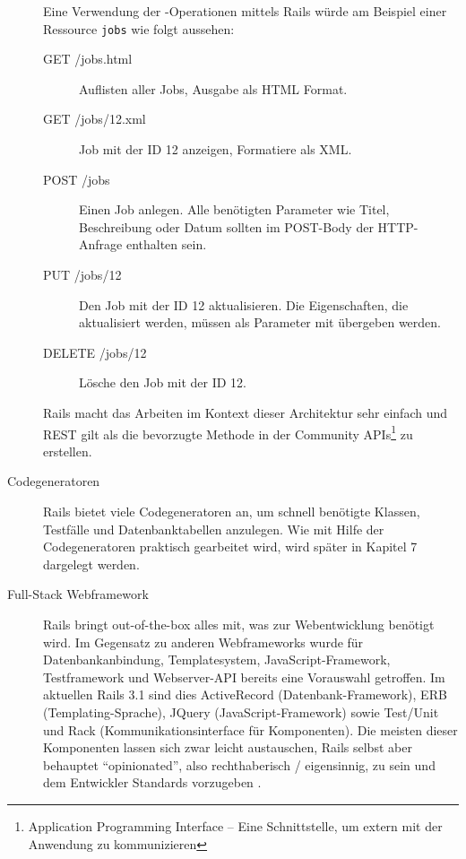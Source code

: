 \begin{description}
 Eine Verwendung der -Operationen mittels Rails würde am Beispiel einer Ressource \texttt{jobs} wie folgt aussehen:
  \begin{description}
  \item[GET /jobs.html] Auflisten aller Jobs, Ausgabe als HTML Format.
  \item[GET /jobs/12.xml] Job mit der ID 12 anzeigen, Formatiere als XML.
  \item[POST /jobs] Einen Job anlegen. Alle benötigten Parameter wie Titel, Beschreibung oder Datum sollten im POST-Body der HTTP-Anfrage enthalten sein.
  \item[PUT /jobs/12] Den Job mit der ID 12 aktualisieren. Die Eigenschaften, die aktualisiert werden, müssen als Parameter mit übergeben werden.
  \item[DELETE /jobs/12] Lösche den Job mit der ID 12.
  \end{description}
 Rails macht das Arbeiten im Kontext dieser Architektur sehr einfach und REST gilt als die bevorzugte Methode in der Community APIs\footnote{Application Programming Interface --  Eine Schnittstelle, um extern mit der Anwendung zu kommunizieren} zu erstellen.
 \item[Codegeneratoren] Rails bietet viele Codegeneratoren an, um schnell benötigte Klassen, Testfälle und Datenbanktabellen anzulegen.  Wie mit Hilfe der Codegeneratoren praktisch gearbeitet wird, wird später in Kapitel 7 dargelegt werden.
 \item[Full-Stack Webframework] Rails 
bringt out-of-the-box alles mit, was zur Webentwicklung benötigt wird. Im Gegensatz zu anderen Webframeworks wurde für Datenbankanbindung, Templatesystem, JavaScript-Framework, Testframework und Webserver-API bereits eine Vorauswahl getroffen. Im aktuellen Rails 3.1 sind dies ActiveRecord (Datenbank-Framework), ERB (Templating-Sprache), JQuery (JavaScript-Framework) sowie Test/Unit und Rack (Kommunikationsinterface für Komponenten). Die meisten dieser Komponenten lassen sich zwar leicht austauschen, Rails selbst aber behauptet "`opinionated"', also rechthaberisch / eigensinnig, zu sein und dem Entwickler Standards vorzugeben \citep{david_heinemeier_hansson_railsconf_2011}.

\end{description}


